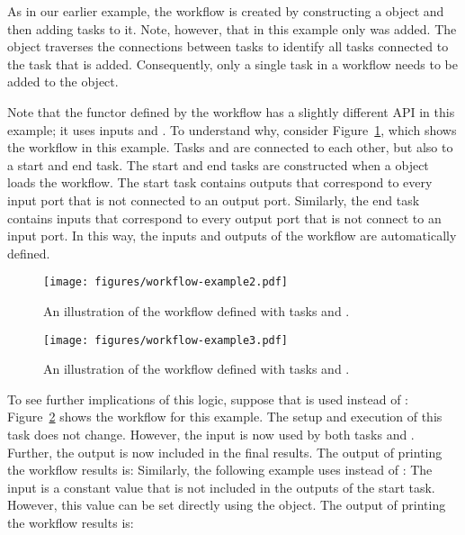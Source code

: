 As in our earlier example, the workflow is created by constructing a  object and then adding tasks to it.  Note, however, that in this example only  was added.  The  object traverses the connections between tasks to identify all tasks connected to the task that is added.  Consequently, 
only a single task in a workflow needs to be added to the  object.

Note that the functor defined by the workflow has a slightly different API
in this example;  it uses inputs  and .  To understand
why, consider Figure~\ref{fig:example2}, which shows the workflow
in this example.  Tasks  and  are connected
to each other, but also to a start and end task.  The start and end
tasks are constructed when a  object loads the workflow.
The start task contains outputs that correspond to every input port that
is not connected to an output port.  Similarly, the end task contains inputs that 
correspond to every output port that is not connect to an input port.  In this way, the inputs and outputs of the workflow are automatically defined.

\begin{figure}[htb]
  \center
  \texttt{[image: figures/workflow-example2.pdf]}
  \caption{An illustration of the workflow defined with tasks  and .}
  \label{fig:example2}
\end{figure}

\begin{figure}[htb]
  \center
  \texttt{[image: figures/workflow-example3.pdf]}
  \caption{An illustration of the workflow defined with tasks  and .}
  \label{fig:example3}
\end{figure}

To see further implications of this logic, suppose that  is used instead of :
Figure~\ref{fig:example3} shows the workflow for this example.  The setup and
execution of this task does not change.  However, the input  is now
used by both tasks  and .  Further, the output 
is now included in the final results.  The output of printing the workflow results
is:
Similarly, the following example uses  instead of :
The input  is a constant
value that is not included in the outputs of the start task.  However, this value
can be set directly using the  object.
The output of printing the workflow results
is:


